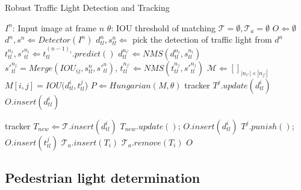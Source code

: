 \begin{algorithm}[ht!]
\caption{Robust Traffic Light Detection and Tracking} 
\label{alg:traffic_light}
\begin{algorithmic}[1]
\State $I^n$: Input image at frame $n$
\State $\theta$: IOU threshold of matching
\State $\mathcal{T} = \emptyset, \mathcal{T}_a = \emptyset$ 
\State $O \Leftarrow \emptyset$
\State $d^{n}, s^{n} \Leftarrow Detector(I^n)$
\State $d_{tl}^{n}, s_{tl}^{n} \Leftarrow$ pick the detection of traffic light from $d^{n}$
{} 
\State $t_{tl}^{n_i}, {s'}_{tl}^{n_i} \Leftarrow  t_{tl}^{(n-1)_i}.predict()$
\EndFor 
\State $d_{tl}^{n_{i'}} \Leftarrow NMS(d_{tl}^{n_i}, s_{tl}^{n_i})$
\State ${s'}_{tl}^{n_{j}} = Merge(IOU_{ij}, s_{tl}^n, {s'}_{tl}^n)$, $t_{tl}^{n_{j'}} \Leftarrow NMS(t_{tl}^{n_j}, {s'}_{tl}^{n_j})$
\State $\mathcal{M} \Leftarrow []_{|n_{i'}| \times |n_{j'}|}$
\State $M[i, j] = IOU(d_{tl}^i, t_{tl}^j$)
\EndFor
\EndFor
\State $ P \Leftarrow Hungarian(M, \theta)$
\State tracker $T^j.update(d_{tl}^i)$
\State $O.insert(d_{tl}^i)$
\EndFor

\State tracker $ T_{new} \Leftarrow \mathcal{T}.insert(d_{tl}^i)$
\State $T_{new}.update()$; $O.insert(d_{tl}^i)$
\EndFor
{}
\State $T^j.punish()$; $O.insert(t_{tl}^j)$
\EndFor
{}
\State $\mathcal{T}_a.insert(T_i)$ 
\EndIf
{}
\State $\mathcal{T}_a.remove(T_i)$
\EndIf
\EndFor
\Return $O$
\EndProcedure
\end{algorithmic}
\end{algorithm}

\subsection{Pedestrian light determination}

